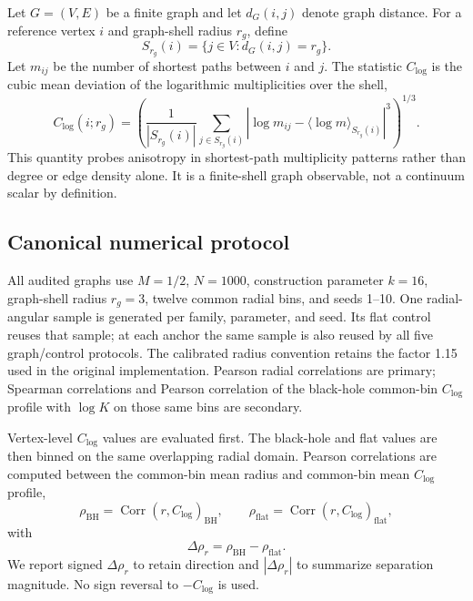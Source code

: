 \documentclass[11pt]{article}
\newcommand{\clog}{C_{\log}}
\newcommand{\drho}{\Delta\rho_r}
\begin{document}
Let $G=(V,E)$ be a finite graph and let $d_G(i,j)$ denote graph distance. For a
reference vertex $i$ and graph-shell radius $r_g$, define
\begin{equation}
    S_{r_g}(i) = \{j \in V : d_G(i,j)=r_g\}.
\end{equation}
Let $m_{ij}$ be the number of shortest paths between $i$ and $j$. The statistic
$\clog$ is the cubic mean deviation of the logarithmic multiplicities over the
shell,
\begin{equation}
    \clog(i;r_g)
    =
    \left(
    \frac{1}{|S_{r_g}(i)|}
    \sum_{j\in S_{r_g}(i)}
    \left|
    \log m_{ij} - \langle \log m \rangle_{S_{r_g}(i)}
    \right|^3
    \right)^{1/3}.
    \label{eq:clog}
\end{equation}
This quantity probes anisotropy in shortest-path multiplicity patterns rather
than degree or edge density alone. It is a finite-shell graph observable, not a
continuum scalar by definition.

\subsection{Canonical numerical protocol}
\label{sec:numerical-protocol}

All audited graphs use $M=1/2$, $N=1000$, construction parameter $k=16$,
graph-shell radius $r_g=3$, twelve common radial bins, and seeds 1--10. One
radial-angular sample is generated per family, parameter, and seed. Its flat
control reuses that sample; at each anchor the same sample is also reused by all
five graph/control protocols. The calibrated radius convention retains the
factor 1.15 used in the original implementation. Pearson radial correlations
are primary; Spearman correlations and Pearson correlation of the black-hole
common-bin $\clog$ profile with $\log K$ on those same bins are secondary.

Vertex-level $\clog$ values are evaluated first. The black-hole and flat values
are then binned on the same overlapping radial domain. Pearson correlations are
computed between the common-bin mean radius and common-bin mean $\clog$ profile,
\begin{equation}
    \rho_{\mathrm{BH}}
    =\operatorname{Corr}\!\left(r,\clog\right)_{\mathrm{BH}},
    \qquad
    \rho_{\mathrm{flat}}
    =\operatorname{Corr}\!\left(r,\clog\right)_{\mathrm{flat}},
\end{equation}
with
\begin{equation}
    \drho = \rho_{\mathrm{BH}}-\rho_{\mathrm{flat}}.
    \label{eq:delta-rho}
\end{equation}
We report signed $\drho$ to retain direction and $|\drho|$ to summarize
separation magnitude. No sign reversal to $-\clog$ is used.
\end{document}
